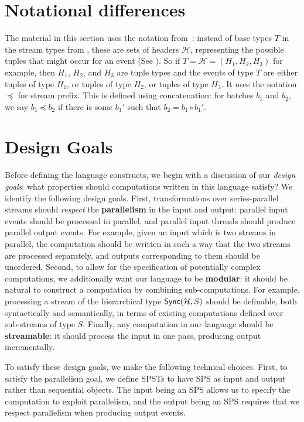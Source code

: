 \section{Notational differences}

The material in this section uses the notation from~:
instead of base types $T$ in the stream types from ,
these are sets of headers $\mathcal{H}$, representing the possible tuples that might occur for an event
(See ).
So if $T = \mathcal{H} = (H_1, H_2, H_3)$ for example, then $H_1$, $H_2$, and $H_3$ are tuple types and the events of type $T$ are either tuples of type $H_1$, or tuples of type $H_2$, or tuples of type $H_3$.
It uses the notation $\preceq$ for stream prefix.
This is defined using concatenation:
for batches $b_1$ and $b_2$, we say $b_1 \preceq b_2$ if there is some $b_1'$ such that $b_2 = b_1 \circ b_1'$.

\section{Design Goals}

Before defining the language constructs, we begin with a discussion of our \emph{design goals}: what properties should computations written in this language satisfy?
We identify the following design goals.
First,
transformations over series-parallel streams should \emph{respect} the \textbf{parallelism}
in the input and output: parallel input events should be processed in parallel,
and parallel input threads should produce parallel output events.
For example, given an input which is two streams in parallel, the computation should be written in such a way that the two streams are processed separately, and outputs corresponding to them should be unordered.
Second,
to allow for the specification of potentially complex computations, we additionally want our language to be \textbf{modular}: it should be natural to construct a computation by combining sub-computations.
For example, processing a stream of the hierarchical type $\mathsf{Sync}({\mathcal{H}}, S)$
should be definable, both syntactically and semantically, in terms of
existing computations defined over sub-streams of type $S$.
Finally, any computation in our language should be \textbf{streamable}: it should process the input in one pass, producing output incrementally.

To satisfy these design goals, we make the following technical choices.
First, to satisfy the parallelism goal, we define SPSTs to have SPS as input and output rather than sequential objects.
The input being an SPS allows us to specify the computation to exploit parallelism,
and the output being an SPS requires that we respect parallelism when producing output events.

